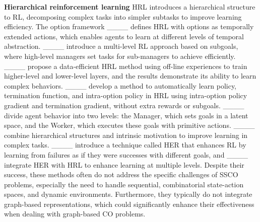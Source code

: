 \textbf{Hierarchical reinforcement learning}\quad
HRL introduces a hierarchical structure to RL, decomposing complex tasks into simpler subtasks to improve learning efficiency. 
The option framework ____ defines HRL with options as temporally extended actions, which enables agents to learn at different levels of temporal abstraction. 
____ introduce a multi-level RL approach based on subgoals, where high-level managers set tasks for sub-managers to achieve efficiently. 
____ propose a data-efficient HRL method using off-line experiences to train higher-level and lower-level layers, and the results demonstrate its ability to learn complex behaviors. 
____ develop a method to automatically learn policy, termination function, and intra-option policy in HRL using intra-option policy gradient and termination gradient, without extra rewards or subgoals. ____ divide agent behavior into two levels: the Manager, which sets goals in a latent space, and the Worker, which executes these goals with primitive actions.
____ combine hierarchical structures and intrinsic motivation to improve learning in complex tasks. ____ introduce a technique called HER that enhances RL by learning from failures as if they were successes with different goals, and ____ integrate HER with HRL to enhance learning at multiple levels.
Despite their success, these methods often do not address the specific challenges of SSCO problems, especially the need to handle sequential, combinatorial state-action spaces, and dynamic environments. Furthermore, they typically do not integrate graph-based representations, which could significantly enhance their effectiveness when dealing with graph-based CO problems.
